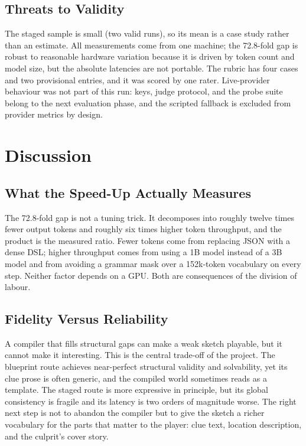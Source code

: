 ﻿\documentclass[11pt,a4paper]{report}
\begin{document}
\section{Threats to Validity}
The staged sample is small (two valid runs), so its mean is a case study rather than an estimate. All measurements come from one machine; the 72.8-fold gap is robust to reasonable hardware variation because it is driven by token count and model size, but the absolute latencies are not portable. The rubric has four cases and two provisional entries, and it was scored by one rater. Live-provider behaviour was not part of this run: keys, judge protocol, and the probe suite belong to the next evaluation phase, and the scripted fallback is excluded from provider metrics by design.

\chapter{Discussion}
\label{ch:discussion}

\section{What the Speed-Up Actually Measures}
The 72.8-fold gap is not a tuning trick. It decomposes into roughly twelve times fewer output tokens and roughly six times higher token throughput, and the product is the measured ratio. Fewer tokens come from replacing JSON with a dense DSL; higher throughput comes from using a 1B model instead of a 3B model and from avoiding a grammar mask over a 152k-token vocabulary on every step. Neither factor depends on a GPU. Both are consequences of the division of labour.

\section{Fidelity Versus Reliability}
A compiler that fills structural gaps can make a weak sketch playable, but it cannot make it interesting. This is the central trade-off of the project. The blueprint route achieves near-perfect structural validity and solvability, yet its clue prose is often generic, and the compiled world sometimes reads as a template. The staged route is more expressive in principle, but its global consistency is fragile and its latency is two orders of magnitude worse. The right next step is not to abandon the compiler but to give the sketch a richer vocabulary for the parts that matter to the player: clue text, location description, and the culprit's cover story.
\end{document}
